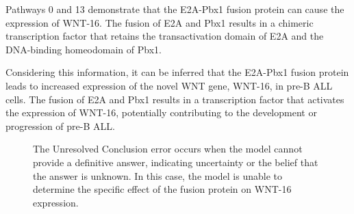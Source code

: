 \begin{tcolorbox}[breakable]
Pathways 0 and 13 demonstrate that the E2A-Pbx1 fusion protein can cause the expression of WNT-16. The fusion of E2A and Pbx1 results in a chimeric transcription factor that retains the transactivation domain of E2A and the DNA-binding homeodomain of Pbx1.

Considering this information, it can be inferred that the E2A-Pbx1 fusion protein leads to increased expression of the novel WNT gene, WNT-16, in pre-B ALL cells. The fusion of E2A and Pbx1 results in a transcription factor that activates the expression of WNT-16, potentially contributing to the development or progression of pre-B ALL.
\end{tcolorbox}

\begin{figure}[!h]
    \vspace{0.01cm}
    \caption{The Unresolved Conclusion error occurs when the model cannot provide a definitive answer, indicating uncertainty or the belief that the answer is unknown. In this case, the model is unable to determine the specific effect of the fusion protein on WNT-16 expression.}
\end{figure}



